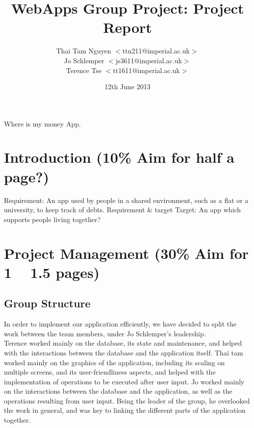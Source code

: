\documentclass[a4paper,11pt]{article}
\begin{document}
\title{WebApps Group Project: Project Report} \date{12th June
  2013} \author{
  Thai Tam Nguyen $<$ttn211@imperial.ac.uk$>$\\
  Jo Schlemper $<$js3611@imperial.ac.uk$>$\\
  Terence Tse  $<$tt1611@imperial.ac.uk$>$ }
\maketitle

Where is my money App.
\section*{Introduction (10\% Aim for half a page?)}

Requirement:
An app used by people in a shared environment, such as a flat or a university, to keep track of debts.
Requirement \& target
Target: 
An app which supports people living together?  

\section*{Project Management (30\% Aim for 1 ~ 1.5 pages)}
\subsection*{Group Structure}
In order to implement our application efficiently, we have decided to split the work between the team members, under Jo Schlemper’s leadership. \\
Terence worked mainly on the database, its state and maintenance, and helped with the interactions between the database and the application itself.
Thai tam worked mainly on the graphics of the application, including its scaling on multiple screens, and its user-friendliness aspects, and helped with the implementation of operations to be executed after user input.
Jo worked mainly on the interactions between the database and the application, as well as the operations resulting from user input. Being the leader of the group, he overlooked the work in general, and was key to linking the different parts of the application together.
 
\end{document}
